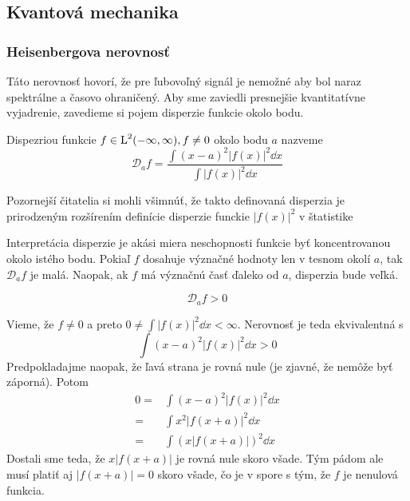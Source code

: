 \subsection{Kvantová mechanika}
\subsubsection{Heisenbergova nerovnosť}

Táto nerovnosť hovorí, že pre ľubovoľný signál je nemožné aby bol
naraz spektrálne a časovo ohraničený.
Aby sme zaviedli presnejšie kvantitatívne vyjadrenie, zavedieme si pojem
disperzie funkcie okolo bodu.

\def\disperzia#1{\mathcal{D}_{#1}}
\begin{definicia}
    Dispezriou funkcie $f \in \mbox{L}^2(-\infty,\infty), f \not = 0$ okolo bodu $a$ nazveme
    \begin{equation}
        \disperzia{a} f = \frac{\int (x-a)^2 |f(x)|^2 \dd x}
                               {\int |f(x)|^2 \dd x}
    \end{equation}
\end{definicia}
\begin{poznamka}
    Pozornejší čitatelia si mohli všimnúť, že takto definovaná
    disperzia je prirodzeným rozšírením definície disperzie funckie
    $|f(x)|^2$ v štatistike
\end{poznamka}

Interpretácia disperzie je akási miera neschopnosti funkcie byť
koncentrovanou okolo istého bodu. Pokiaľ $f$ dosahuje význačné hodnoty
len v tesnom okolí $a$, tak $\disperzia{a}f$ je malá. Naopak, ak
$f$ má význačnú časť ďaleko od $a$, disperzia bude veľká.

\begin{lema}
    \begin{equation}
        \disperzia{a}f > 0
    \end{equation}
    \label{lema:nenulova_disperzia}
\end{lema}
\begin{dokaz}
    Vieme, že $f\not=0$ a preto $0 \not=\int |f(x)|^2 \dd x <\infty$.
    Nerovnosť je teda ekvivalentná s
    \begin{equation}
        \int (x-a)^2 |f(x)|^2 \dd x > 0
    \end{equation}
    Predpokladajme naopak, že ľavá strana je rovná nule (je zjavné, že
    nemôže byť záporná). Potom
    \begin{equation}
    \begin{split}
     0 = & \int (x-a)^2 |f(x)|^2 \dd x \\
         =& \int x^2 |f(x+a)|^2 \dd x \\
         =& \int (x |f(x+a)|)^2 \dd x
    \end{split}
    \end{equation}
    Dostali sme teda, že $x|f(x+a)|$ je rovná nule skoro všade.
    Tým pádom ale musí platiť aj $|f(x+a)|=0$ skoro všade, čo je 
    v spore s tým, že $f$ je nenulová funkcia.
\end{dokaz}

